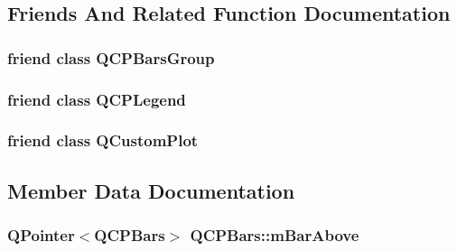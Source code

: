 \subsection{Friends And Related Function Documentation}
\subsubsection[{\texorpdfstring{Q\+C\+P\+Bars\+Group}{QCPBarsGroup}}]{\setlength{\rightskip}{0pt plus 5cm}friend class {\bf Q\+C\+P\+Bars\+Group}\hspace{0.3cm}{\ttfamily [friend]}}\hypertarget{classQCPBars_ae1051b4d58a2786cb420367a586e2fee}{}\label{classQCPBars_ae1051b4d58a2786cb420367a586e2fee}
\subsubsection[{\texorpdfstring{Q\+C\+P\+Legend}{QCPLegend}}]{\setlength{\rightskip}{0pt plus 5cm}friend class {\bf Q\+C\+P\+Legend}\hspace{0.3cm}{\ttfamily [friend]}}\hypertarget{classQCPBars_a8429035e7adfbd7f05805a6530ad5e3b}{}\label{classQCPBars_a8429035e7adfbd7f05805a6530ad5e3b}
\subsubsection[{\texorpdfstring{Q\+Custom\+Plot}{QCustomPlot}}]{\setlength{\rightskip}{0pt plus 5cm}friend class {\bf Q\+Custom\+Plot}\hspace{0.3cm}{\ttfamily [friend]}}\hypertarget{classQCPBars_a1cdf9df76adcfae45261690aa0ca2198}{}\label{classQCPBars_a1cdf9df76adcfae45261690aa0ca2198}


\subsection{Member Data Documentation}
\subsubsection[{\texorpdfstring{m\+Bar\+Above}{mBarAbove}}]{\setlength{\rightskip}{0pt plus 5cm}Q\+Pointer$<${\bf Q\+C\+P\+Bars}$>$ Q\+C\+P\+Bars\+::m\+Bar\+Above\hspace{0.3cm}{\ttfamily [protected]}}\hypertarget{classQCPBars_a0c1c46076c41a478dbb373cfd35929aa}{}\label{classQCPBars_a0c1c46076c41a478dbb373cfd35929aa}
